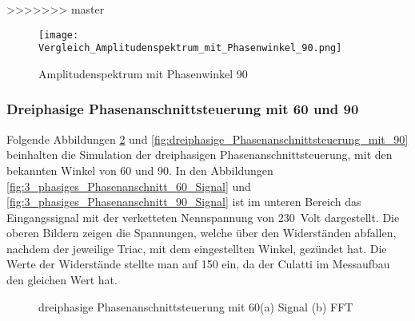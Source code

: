 >>>>>>> master


\begin{figure}[ht!]
	\centering
	\texttt{[image: Vergleich\_Amplitudenspektrum\_mit\_Phasenwinkel\_90.png]}	
	\caption{Amplitudenspektrum mit Phasenwinkel 90\textdegree}
	\label{fig:Amplitudenspektrum mit Phasenwinkel 90grad}
\end{figure}


\subsubsection{Dreiphasige Phasenanschnittsteuerung mit 60\textdegree\hspace{0.02cm} und 90\textdegree\hspace{0.02cm}}


Folgende Abbildungen \ref{fig:dreiphasige_Phasenanschnittsteuerung_mit_60} und \ref{fig:dreiphasige_Phasenanschnittsteuerung_mit_90} beinhalten die Simulation der dreiphasigen Phasenanschnittsteuerung, mit den bekannten Winkel von 60\textdegree\hspace{0.02cm} und 90\textdegree\hspace{0.02cm}.
In den Abbildungen \ref{fig:3_phasiges_Phasenanschnitt_60_Signal} und \ref{fig:3_phasiges_Phasenanschnitt_90_Signal} ist im  unteren Bereich das Eingangssignal mit der verketteten Nennspannung von \SI{230}{Volt} dargestellt. Die oberen Bildern zeigen die Spannungen, welche über den Widerständen abfallen, nachdem der jeweilige Triac, mit dem eingestellten Winkel, gezündet hat. Die Werte der Widerstände stellte man auf \SI{150}{\Omega} ein, da der Culatti im Messaufbau den gleichen Wert hat. 

\begin{figure}[ht!]
	\centering
	\qquad
	\caption{dreiphasige Phasenanschnittsteuerung mit 60\textdegree (a) Signal (b) FFT}
	\label{fig:dreiphasige_Phasenanschnittsteuerung_mit_60}
\end{figure}


